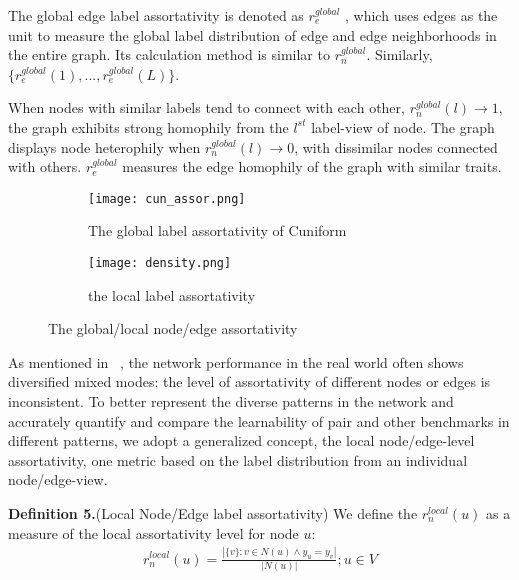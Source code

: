\documentclass[10pt,journal,compsoc]{IEEEtran}
\begin{document}
    
  The global edge label assortativity is denoted as  $r_e^{global}$ , which uses edges as the unit to measure the global label distribution of edge and edge neighborhoods in the entire graph. Its calculation method is similar to $r_n^{global}$. Similarly, $\{r_e^{global}(1),...,r_e^{global}(L)\}$.
    

    















When nodes with similar labels tend to connect with each other, $r^{global}_n(l) \rightarrow 1$, the graph exhibits strong homophily from the $l^{st}$ label-view of node. The graph displays node heterophily when $r^{global}_n(l) \rightarrow 0$, with dissimilar nodes connected with others. $r^{global}_e$ measures the edge homophily of the graph with similar traits. 

 




\begin{figure}[htb]
\centering
\begin{subfigure}{0.49\columnwidth}
\centering
\texttt{[image: cun\_assor.png]}
\caption{The global label assortativity of Cuniform}
\end{subfigure}
\begin{subfigure}{0.49\columnwidth}
\centering
\texttt{[image: density.png]}

 \caption{the local label assortativity}
\end{subfigure}
\caption{The global/local node/edge assortativity }
\label{fig:graph-assortativity}
\end{figure}
 
As mentioned in ~\cite{suresh2021breaking}, the network performance in the real world often shows diversified mixed modes: the level of assortativity of different nodes or edges is inconsistent. To better represent the diverse patterns in the network and accurately quantify and compare the learnability of pair and other benchmarks in different patterns, we adopt a generalized concept, the local node/edge-level assortativity, one metric  based on the label distribution from an individual node/edge-view. 

\noindent \textbf{Definition 5.}(Local Node/Edge label assortativity) We define the  $r_n^{local}(u)$ as a measure of the local assortativity level for node $u$:
\begin{equation}
\begin{aligned} 
    r_n^{local}(u) = \frac{|\{v\}:v\in N(u)\land y_u=y_{v}|}{|N(u)|};u \in V 
\end{aligned}
\end{equation}
\end{document}
